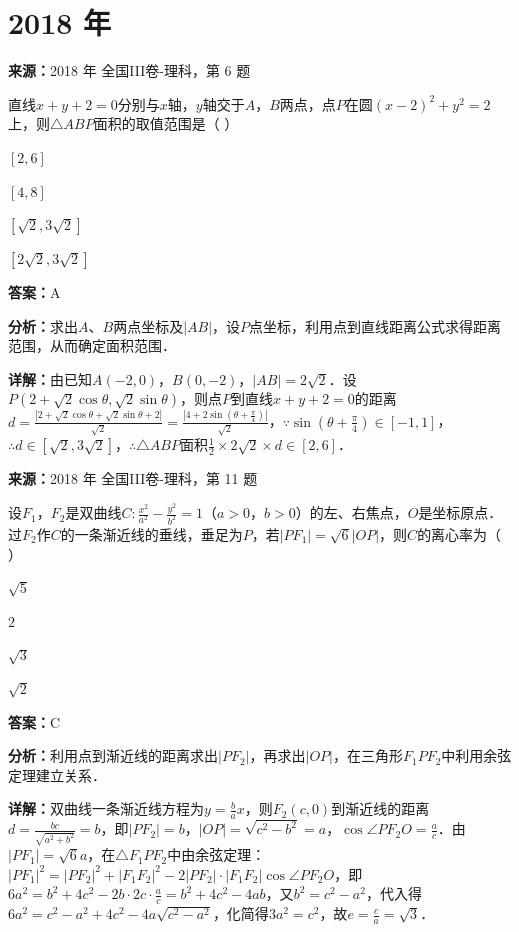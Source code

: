 \section*{2018 年}

\begin{question}[points=5]
\textbf{来源：}2018 年 全国III卷-理科，第 6 题\par
直线$x+y+2=0$分别与$x$轴，$y$轴交于$A$，$B$两点，点$P$在圆$(x-2)^2+y^2=2$上，则$\triangle ABP$面积的取值范围是（ ）
\begin{choices}
  \item $[2,6]$
  \item $[4,8]$
  \item $[\sqrt{2},3\sqrt{2}]$
  \item $[2\sqrt{2},3\sqrt{2}]$
\end{choices}
\begin{solution}
\textbf{答案：}A

\textbf{分析：}求出$A$、$B$两点坐标及$|AB|$，设$P$点坐标，利用点到直线距离公式求得距离范围，从而确定面积范围．

\textbf{详解：}由已知$A(-2,0)$，$B(0,-2)$，$|AB|=2\sqrt{2}$．设$P(2+\sqrt{2}\cos\theta,\sqrt{2}\sin\theta)$，则点$P$到直线$x+y+2=0$的距离$d=\frac{|2+\sqrt{2}\cos\theta+\sqrt{2}\sin\theta+2|}{\sqrt{2}}=\frac{|4+2\sin(\theta+\frac{\pi}{4})|}{\sqrt{2}}$，$\because \sin(\theta+\frac{\pi}{4})\in[-1,1]$，$\therefore d\in[\sqrt{2},3\sqrt{2}]$，$\therefore \triangle ABP$面积$\frac{1}{2}\times2\sqrt{2}\times d\in[2,6]$．
\end{solution}
\end{question}

\begin{question}[points=5]
\textbf{来源：}2018 年 全国III卷-理科，第 11 题\par
设$F_1$，$F_2$是双曲线$C:\frac{x^2}{a^2}-\frac{y^2}{b^2}=1$（$a>0$，$b>0$）的左、右焦点，$O$是坐标原点．过$F_2$作$C$的一条渐近线的垂线，垂足为$P$，若$|PF_1|=\sqrt{6}|OP|$，则$C$的离心率为（ ）
\begin{choices}
  \item $\sqrt{5}$
  \item $2$
  \item $\sqrt{3}$
  \item $\sqrt{2}$
\end{choices}
\begin{solution}
\textbf{答案：}C

\textbf{分析：}利用点到渐近线的距离求出$|PF_2|$，再求出$|OP|$，在三角形$F_1PF_2$中利用余弦定理建立关系．

\textbf{详解：}双曲线一条渐近线方程为$y=\frac{b}{a}x$，则$F_2(c,0)$到渐近线的距离$d=\frac{bc}{\sqrt{a^2+b^2}}=b$，即$|PF_2|=b$，$|OP|=\sqrt{c^2-b^2}=a$，$\cos\angle PF_2O=\frac{a}{c}$．由$|PF_1|=\sqrt{6}a$，在$\triangle F_1PF_2$中由余弦定理：$|PF_1|^2=|PF_2|^2+|F_1F_2|^2-2|PF_2|\cdot|F_1F_2|\cos\angle PF_2O$，即$6a^2=b^2+4c^2-2b\cdot2c\cdot\frac{a}{c}=b^2+4c^2-4ab$，又$b^2=c^2-a^2$，代入得$6a^2=c^2-a^2+4c^2-4a\sqrt{c^2-a^2}$，化简得$3a^2=c^2$，故$e=\frac{c}{a}=\sqrt{3}$．
\end{solution}
\end{question}

